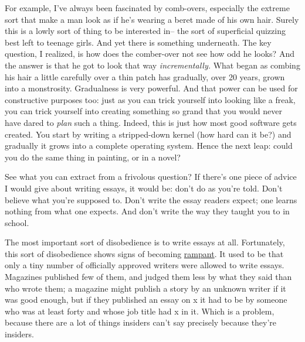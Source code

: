 For
                  example, I've always been fascinated by comb-overs, especially
                  the extreme sort that make a man look as if he's wearing a
                  beret made of his own hair. Surely this is a lowly sort of
                  thing to be interested in-- the sort of superficial quizzing
                  best left to teenage girls. And yet there is something
                  underneath. The key question, I realized, is how does the
                  comber-over not see how odd he looks? And the answer is that
                  he got to look that way \emph{incrementally.}
                  What began as combing his hair a little carefully over a thin
                  patch has gradually, over 20 years, grown into a monstrosity.
                  Gradualness is very powerful. And that power can be used for
                  constructive purposes too: just as you can trick yourself into
                  looking like a freak, you can trick yourself into creating
                  something so grand that you would never have dared to
                  \emph{plan} such a thing. Indeed, this is just how most good
                  software gets created. You start by writing a stripped-down
                  kernel (how hard can it be?) and gradually it grows into a
                  complete operating system. Hence the next leap: could you do
                  the same thing in painting, or in a novel?

See what
                  you can extract from a frivolous question? If there's one
                  piece of advice I would give about writing essays, it would
                  be: don't do as you're told. Don't believe what you're
                  supposed to. Don't write the essay readers expect; one learns
                  nothing from what one expects. And don't write the way they
                  taught you to in school.

The most important sort of
                  disobedience is to write essays at all. Fortunately, this sort
                  of disobedience shows signs of becoming
                  \href{http://www.ojr.org/ojr/glaser/1056050270.php}{rampant}. It used to be that only a tiny number of officially
                  approved writers were allowed to write essays. Magazines
                  published few of them, and judged them less by what they said
                  than who wrote them; a magazine might publish a story by an
                  unknown writer if it was good enough, but if they published an
                  essay on x it had to be by someone who was at least forty and
                  whose job title had x in it. Which is a problem, because there
                  are a lot of things insiders can't say precisely because
                  they're insiders.

